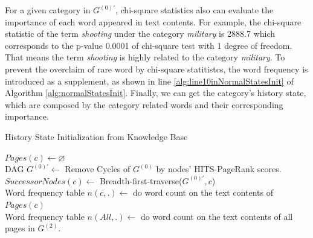 \documentclass{article}
\begin{document}
For a given category in \(G^{(0)'}\), chi-square statistics also can evaluate the importance of each word appeared in text contents. 
For example, the chi-square statistic of the term \textit{shooting} under the category \textit{military} is 2888.7 which corresponds to the p-value 0.0001 of chi-square test with 1 degree of freedom.
That means the term \textit{shooting} is highly related to the category \textit{military}.  
To prevent the overclaim of rare word by chi-square statitistcs, the word frequency is introduced as a supplement\cite{liu2009imbalanced}, as shown in line \ref{alg:line10inNormalStatesInit} of Algorithm \ref{alg:normalStatesInit}.
Finally, we can get the category's history state, which are  composed by the category related words and their corresponding importance.
\begin{algorithm}[h]
\scriptsize
\caption{History State Initialization from Knowledge Base}
\label{alg:normalStatesInit}

\(Pages(c)\leftarrow \varnothing\)\\
DAG \(G^{(0)'} \leftarrow\) Remove Cycles of \(G^{(0)}\) by nodes' HITS-PageRank scores. \label{alg:line2inNormalStatesInit}\\
\(SuccessorNodes(c) \leftarrow \) Breadth-first-traverse(\(G^{(0)'},c\))\label{alg:line3inNormalStatesInit}\\
Word frequency table \(n(c,.) \leftarrow \) do word count on the text contents of \(Pages(c)\) \\
Word frequency table \(n(All,.) \leftarrow \) do word count on the text contents of all pages in \(G^{(2)}\).\\
\end{algorithm}
\end{document}
